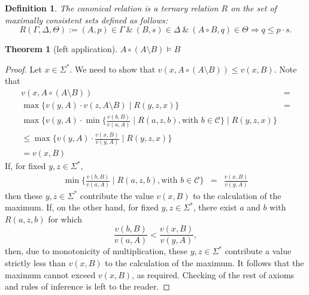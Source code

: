 \documentclass[11pt]{article}
\newtheorem{definition}{Definition}
\newtheorem{theorem}{Theorem}[section]
\begin{document}
\begin{definition}
  The canonical relation is a ternary relation $R$ on the set of maximally consistent sets defined as follows:
  $$
  R(\Gamma, \Delta, \Theta) := (A, p) \in \Gamma ~\&~ (B, s) \in \Delta ~\&~ (A \circ B, q) \in \Theta \Rightarrow q \leqslant p \cdot s.
  $$
\end{definition}


\begin{theorem}[left application]
$A \circ (A \setminus B) \models
B$
\end{theorem}

\begin{proof}

Let $x \in \Sigma^\ast$. We need to show that
$v(x, A \circ (A \setminus B)) \leqslant v(x, B)$. Note that
$$ 
\begin{array}{rl}
     v(x, A \circ (A \setminus B)) &  = \\
     \max \{ v(y, A) \cdot v(z, A \setminus B) \mid R(y, z, x) \} & = \\
     \max \{ v(y, A) \cdot \min \{ \frac{v(b, B)}{v(a, A)}\mid R(a, z, b),
  \mbox{with $b \in \mathcal{C}$} \} \mid R(y, z, x) \} \\
  \leq \max \{ v(y, A) \cdot \frac{v(x, B)}{v(y, A)} \mid R(y, z, x) \} \\
  =  v(x, B)
\end{array}
$$
If, for fixed $y, z \in \Sigma^\ast$,
$$
\begin{array}{lcl}
\min \{ \frac{v(b, B)}{v(a, A)} \mid R(a, z, b),
  \mbox{with $b \in \mathcal{C}$} \} & = & \frac{v(x, B)}{v(y, A)}
\end{array}
$$
then these $y, z \in \Sigma^\ast$ contribute the value $v(x, B)$ to the
calculation of the maximum.  If, on the other hand, for fixed
$y, z \in \Sigma^\ast$, there exist $a$ and $b$ with $R(a, z, b)$ for which
$$
\frac{v(b, B)}{v(a, A)} < \frac{v(x, B)}{v(y, A)},
$$
then, due to monotonicity of multiplication, these $y, z \in \Sigma^\ast$
contribute a value strictly less than $v(x, B)$ to the calculation of the
maximum.  It follows that the maximum cannot exceed $v(x, B)$, as required.
Checking of the rest of axioms and rules of inference is left to the reader.
\end{proof}


\printbibliography
\end{document}
